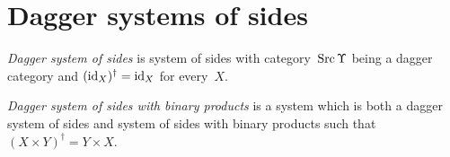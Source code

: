 \section{Dagger systems of sides}

\begin{defn}
\emph{Dagger system of sides} is system of sides with category~$\operatorname{Src}\Upsilon$ being a dagger category
and $(\operatorname{id}_X)^\dagger = \operatorname{id}_X$ for every~$X$.
\end{defn}

\begin{defn}
\emph{Dagger system of sides with binary products} is a system which is both a dagger system of sides and system of sides with binary products
such that $(X\times Y)^\dagger = Y\times X$.
\end{defn}